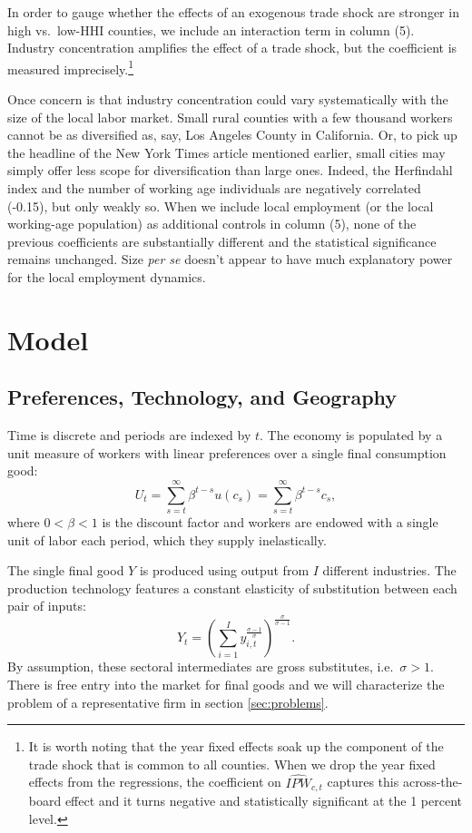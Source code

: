 \documentclass[onehalfspacing,11pt]{article}
\begin{document}
In order to gauge whether the effects of an exogenous trade shock are stronger in high vs.~low-HHI counties, we include an interaction term in column (5). Industry concentration amplifies the effect of a trade shock, but the coefficient is measured imprecisely.\footnote{It is worth noting that the year fixed effects soak up the component of the trade shock that is common to all counties. When we drop the year fixed effects from the regressions, the coefficient on $\widehat{IPW}_{c,t}$ captures this across-the-board effect and it turns negative and statistically significant at the 1 percent level.}

Once concern is that industry concentration could vary systematically with the size of the local labor market. Small rural counties with a few thousand workers cannot be as diversified as, say, Los Angeles County in California. Or, to pick up the headline of the New York Times article mentioned earlier, small cities may simply offer less scope for diversification than large ones. Indeed, the Herfindahl index and the number of working age individuals are negatively correlated (-0.15), but only weakly so. When we include local employment (or the local working-age population) as additional controls in column (5), none of the previous coefficients are substantially different and the statistical significance remains unchanged. Size {\it per se} doesn't appear to have much explanatory power for the local employment dynamics.

\section{Model}
\subsection{Preferences, Technology, and Geography}\label{sec:preferences}
Time is discrete and periods are indexed by $t$. The economy is populated by a unit measure of workers with linear preferences over a single final consumption good:
\begin{equation}
\label{eq:U}
U_t = \sum_{s=t}^\infty \beta^{t-s} u(c_s) = \sum_{s=t}^\infty \beta^{t-s} c_s,
\end{equation}
where $0<\beta < 1$ is the discount factor and workers are endowed with a single unit of labor each period, which they supply inelastically.

The single final good $Y$ is produced using output from $I$ different industries. The production technology features a constant elasticity of substitution between each pair of inputs:
\begin{equation}
\label{eq:Y}
Y_t = \left( \sum_{i=1}^I y_{i,t}^{\frac{\sigma-1}{\sigma}} \right)^{\frac{\sigma}{\sigma-1}}.
\end{equation}
By assumption, these sectoral intermediates are gross substitutes, i.e.~$\sigma>1$. There is free entry into the market for final goods and we will characterize the problem of a representative firm in section \ref{sec:problems}.
\end{document}
